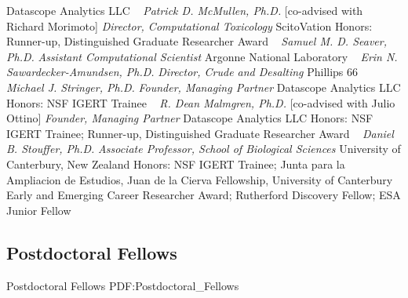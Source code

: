     Datascope Analytics LLC
    \newline
~
\Gap{}
\textit{Patrick D. McMullen, Ph.D.}
    [co-advised with Richard Morimoto]
\newline
    \textit{Director, Computational Toxicology}
    \newline
    ScitoVation
    \newline
    {\footnotesize Honors: Runner-up, Distinguished Graduate Researcher Award}
    \newline
~
\Gap{}
\textit{Samuel M. D. Seaver, Ph.D.}
\newline
    \textit{Assistant Computational Scientist}
    \newline
    Argonne National Laboratory
    \newline
~
\Gap{}
\textit{Erin N. Sawardecker-Amundsen, Ph.D.}
\newline
    \textit{Director, Crude and Desalting}
    \newline
    Phillips 66
    \newline
~
\Gap{}
\textit{Michael J. Stringer, Ph.D.}
\newline
    \textit{Founder, Managing Partner}
    \newline
    Datascope Analytics LLC
    \newline
    {\footnotesize Honors: NSF IGERT Trainee}
    \newline
~
\Gap{}
\textit{R. Dean Malmgren, Ph.D.}
    [co-advised with Julio Ottino]
\newline
    \textit{Founder, Managing Partner}
    \newline
    Datascope Analytics LLC
    \newline
    {\footnotesize Honors: NSF IGERT Trainee; Runner-up, Distinguished Graduate Researcher Award}
    \newline
~
\Gap{}
\textit{Daniel B. Stouffer, Ph.D.}
\newline
    \textit{Associate Professor, School of Biological Sciences}
    \newline
    University of Canterbury, New Zealand
    \newline
    {\footnotesize Honors: NSF IGERT Trainee; Junta para la Ampliacion de Estudios, Juan de la Cierva Fellowship, University of Canterbury Early and Emerging Career Researcher Award; Rutherford Discovery Fellow; ESA Junior Fellow}
    \newline
~
\Gap\vspace*{0.2cm}\subsection
{Postdoctoral Fellows}
{Postdoctoral Fellows}
{PDF:Postdoctoral_Fellows}

